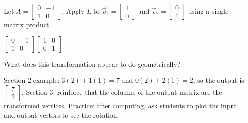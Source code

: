 \documentclass[10pt]{article}
\begin{document}
\begin{practicebox}
\small
Let $A = \begin{bmatrix}0 & -1 \\ 1 & 0\end{bmatrix}$.
Apply $L$ to $\vec{v}_1 = \begin{bmatrix}1\\0\end{bmatrix}$ and
$\vec{v}_2 = \begin{bmatrix}0\\1\end{bmatrix}$ using a single matrix product.

\vspace{0.08in}
$\begin{bmatrix}0 & -1 \\ 1 & 0\end{bmatrix}
\begin{bmatrix}1 & 0\\ 0 & 1\end{bmatrix} = $ 

\vspace{0.08in}
What does this transformation appear to do geometrically?
\end{practicebox}

\begin{teachernote}
Section 2 example: $3(2)+1(1)=7$ and $0(2)+2(1)=2$, so the output is $\begin{bmatrix}7\\2\end{bmatrix}$.
Section 3: reinforce that the columns of the output matrix are the transformed vertices.
Practice: after computing, ask students to plot the input and output vectors to see the rotation.
\end{teachernote}
\end{document}
